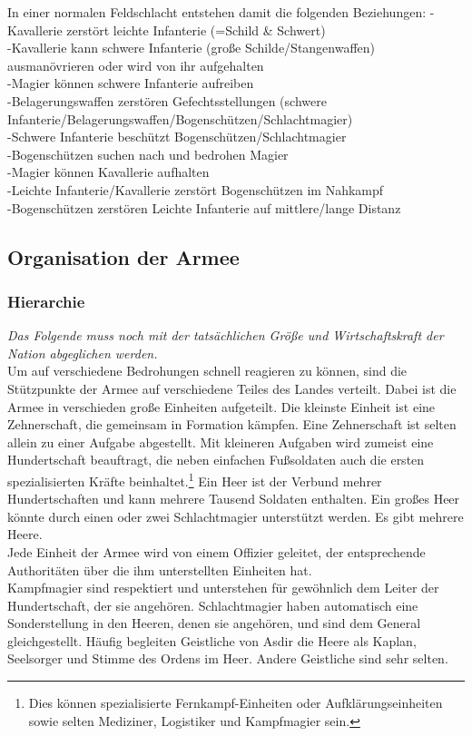 In einer normalen Feldschlacht entstehen damit die folgenden Beziehungen:
-Kavallerie zerstört leichte Infanterie (=Schild & Schwert)\\
-Kavallerie kann schwere Infanterie (große Schilde/Stangenwaffen) ausmanövrieren oder wird von ihr aufgehalten\\
-Magier können schwere Infanterie aufreiben\\
-Belagerungswaffen zerstören Gefechtsstellungen (schwere Infanterie/Belagerungswaffen/Bogenschützen/Schlachtmagier)\\
-Schwere Infanterie beschützt Bogenschützen/Schlachtmagier\\
-Bogenschützen suchen nach und bedrohen Magier\\
-Magier können Kavallerie aufhalten\\
-Leichte Infanterie/Kavallerie zerstört Bogenschützen im Nahkampf\\
-Bogenschützen zerstören Leichte Infanterie auf mittlere/lange Distanz 

\subsection{Organisation der Armee}
\subsubsection{Hierarchie}
\emph{Das Folgende muss noch mit der tatsächlichen Größe und Wirtschaftskraft der Nation abgeglichen werden.}\\
Um auf verschiedene Bedrohungen schnell reagieren zu können, sind die Stützpunkte der Armee auf verschiedene Teiles des Landes verteilt. 
Dabei ist die Armee in verschieden große Einheiten aufgeteilt. Die kleinste Einheit ist eine Zehnerschaft, die gemeinsam in Formation kämpfen. 
Eine Zehnerschaft ist selten allein zu einer Aufgabe abgestellt. Mit kleineren Aufgaben wird zumeist eine Hundertschaft beauftragt, die neben einfachen 
Fußsoldaten auch die ersten spezialisierten Kräfte beinhaltet.\footnote{Dies können spezialisierte Fernkampf-Einheiten oder Aufklärungseinheiten sowie selten Mediziner, Logistiker und Kampfmagier sein.} 
Ein Heer ist der Verbund mehrer Hundertschaften und kann mehrere Tausend Soldaten enthalten. Ein großes Heer könnte durch einen oder zwei Schlachtmagier unterstützt werden.
 Es gibt mehrere Heere.\\
Jede Einheit der Armee wird von einem Offizier geleitet, der entsprechende Authoritäten über die ihm unterstellten Einheiten hat.\\
Kampfmagier sind respektiert und unterstehen für gewöhnlich dem Leiter der Hundertschaft, der sie angehören. 
Schlachtmagier haben automatisch eine Sonderstellung in den Heeren, denen sie angehören, und sind dem General gleichgestellt. 
Häufig begleiten Geistliche von Asdir die Heere als Kaplan, Seelsorger und Stimme des Ordens im Heer. Andere Geistliche sind sehr selten.
